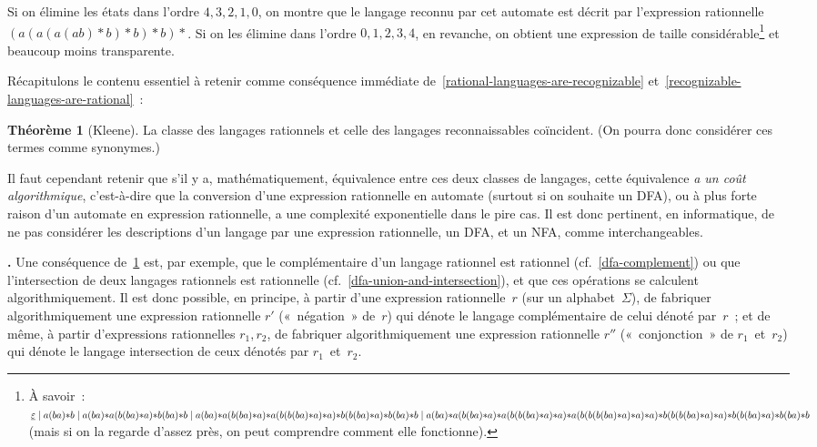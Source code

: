 \documentclass[12pt,a4paper]{article}
\theoremstyle{definition}
\newcommand\thingy{%
\refstepcounter{comcnt}\medskip\noindent\textbf{\thecomcnt.} }
\newtheorem{thm}[comcnt]{Théorème}
\begin{document}
Si on élimine les états dans l'ordre $4,3,2,1,0$, on montre que le
langage reconnu par cet automate est décrit par l'expression
rationnelle $(a(a(a(ab){*}b){*}b){*}b){*}$.  Si on les élimine dans
l'ordre $0,1,2,3,4$, en revanche, on obtient une expression de taille
considérable\footnote{À savoir : $\underline{\varepsilon} \penalty0 \;
  | \penalty0 \; a(ba){*}b \penalty0 \; | \penalty0 \;
  a(ba){*}a(b(ba){*}a){*}b(ba){*}b \penalty0 \; | \penalty0 \;
  a(ba){*}a(b(ba){*}a){*}a(b(b(ba){*}a){*}a){*}b(b(ba){*}a){*}b(ba){*}b
  \penalty0 \; | \penalty0 \;
  a(ba){*}a(b(ba){*}a){*}a(b(b(ba){*}a){*}a){*}a(b(b(b(ba){*}a){*}a){*}a){*}b(b(b(ba){*}a){*}a){*}b(b(ba){*}a){*}b(ba){*}b$
  (mais si on la regarde d'assez près, on peut comprendre comment elle
  fonctionne).}  et beaucoup moins transparente.

\bigbreak

Récapitulons le contenu essentiel à retenir comme conséquence
immédiate de \ref{rational-languages-are-recognizable}
et \ref{recognizable-languages-are-rational} :

\begin{thm}[Kleene]\label{kleenes-theorem}
La classe des langages rationnels et celle des langages
reconnaissables coïncident.  (On pourra donc considérer ces termes
comme synonymes.)
\end{thm}

\smallskip

Il faut cependant retenir que s'il y a, mathématiquement, équivalence
entre ces deux classes de langages, cette équivalence \emph{a un coût
  algorithmique}, c'est-à-dire que la conversion d'une expression
rationnelle en automate (surtout si on souhaite un DFA), ou à plus
forte raison d'un automate en expression rationnelle, a une complexité
exponentielle dans le pire cas.  Il est donc pertinent, en
informatique, de ne pas considérer les descriptions d'un langage par
une expression rationnelle, un DFA, et un NFA, comme interchangeables.

\thingy Une conséquence de \ref{kleenes-theorem} est, par exemple, que
le complémentaire d'un langage rationnel est rationnel
(cf. \ref{dfa-complement}) ou que l'intersection de deux langages
rationnels est rationnelle (cf. \ref{dfa-union-and-intersection}), et
que ces opérations se calculent algorithmiquement.  Il est donc
possible, en principe, à partir d'une expression rationnelle $r$ (sur
un alphabet $\Sigma$), de fabriquer algorithmiquement une expression
rationnelle $r'$ (« négation » de $r$) qui dénote le langage
complémentaire de celui dénoté par $r$ ; et de même, à partir
d'expressions rationnelles $r_1,r_2$, de fabriquer algorithmiquement
une expression rationnelle $r''$ (« conjonction » de $r_1$ et $r_2$)
qui dénote le langage intersection de ceux dénotés par $r_1$ et $r_2$.
\end{document}
